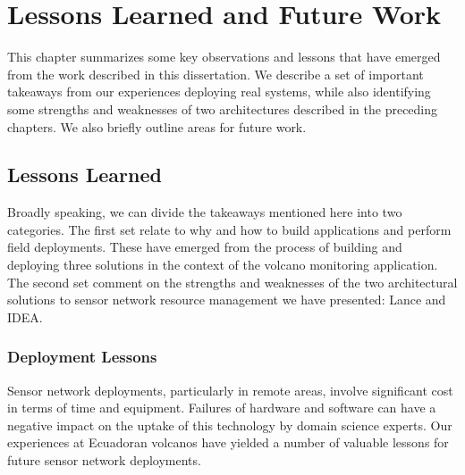 \chapter{Lessons Learned and Future Work}
\label{chapter-lessons}

This chapter summarizes some key observations and lessons that have emerged
from the work described in this dissertation. We describe a set of important
takeaways from our experiences deploying real systems, while also identifying
some strengths and weaknesses of two architectures described in the preceding
chapters. We also briefly outline areas for future work.

\section{Lessons Learned}

Broadly speaking, we can divide the takeaways mentioned here into two
categories. The first set relate to why and how to build applications and
perform field deployments. These have emerged from the process of building
and deploying three solutions in the context of the volcano monitoring
application. The second set comment on the strengths and weaknesses of the
two architectural solutions to sensor network resource management we have
presented: Lance and IDEA.

\subsection{Deployment Lessons}

Sensor network deployments, particularly in remote areas, involve significant
cost in terms of time and equipment. Failures of hardware and software can
have a negative impact on the uptake of this technology by domain science
experts. Our experiences at Ecuadoran volcanos have yielded a number of
valuable lessons for future sensor network deployments. 


